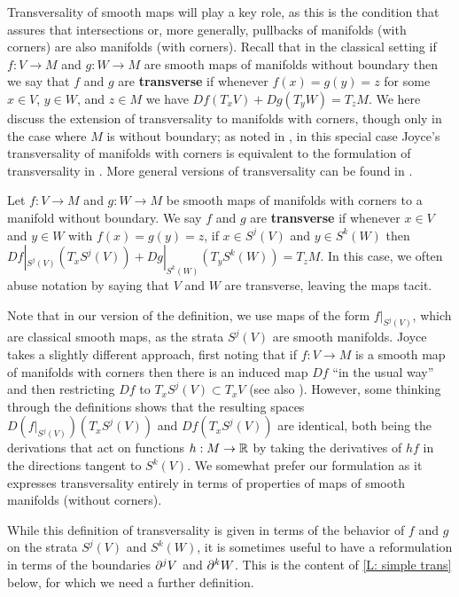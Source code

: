 Transversality of smooth maps will play a key role, as this is the condition that assures that intersections or, more generally, pullbacks of manifolds (with corners) are also manifolds (with corners).
Recall that in the classical setting if $f \colon V \to M$ and $g \colon W \to M$ are smooth maps of manifolds without boundary then we say that $f$ and $g$ are \textbf{transverse} if whenever $f(x) = g(y) = z$ for some $x \in V$, $y \in W$, and $z \in M$ we have $Df(T_xV)+Dg(T_yW) = T_z M$.
We here discuss the extension of transversality to manifolds with corners, though only in the case where $M$ is without boundary; as noted in \cite[Remark 6.3]{Joy12}, in this special case Joyce's transversality of manifolds with corners is equivalent to the formulation of transversality in \cite[Section 7.2]{MaDo92}.
More general versions of transversality can be found in \cite[Section 6]{Joy12}.

\begin{definition}{\cite[Special case of Definition 6.1]{Joy12}}
	Let $f \colon V \to M$ and $g \colon W \to M$ be smooth maps of manifolds with corners to a manifold without boundary.
	We say $f$ and $g$ are \textbf{transverse} if whenever $x \in V$ and $y\in W$ with $f(x) = g(y) = z$, if  $x\in S^j(V)$ and $y \in S^k(W)$  then $Df|_{S^j(V)}(T_xS^j(V))+Dg|_{S^k(W)}(T_yS^k(W)) = T_zM$.
	In this case, we often abuse notation by saying that $V$ and $W$ are transverse, leaving the maps tacit.
\end{definition}

Note that in our version of the definition, we use maps of the form $f|_{S^j(V)}$, which are classical smooth maps, as the strata $S^j(V)$ are smooth manifolds. Joyce takes a slightly different approach, first noting that if $f:V\to M$ is a smooth map of manifolds with corners then there is an induced map $Df$ ``in the usual way'' \cite[Definition 3.2]{Joy12} and then restricting $Df$ to $T_xS^j(V)\subset T_xV$ (see also \cite[Proposition 2.4]{Joy12}). However, some thinking through the definitions shows that the resulting spaces $D(f|_{S^j(V)})(T_xS^j(V))$ and $Df(T_xS^j(V))$ are identical, both being the derivations that act on functions $h:M\to \mathbb{R}$ by taking the derivatives of $hf$ in the directions tangent to $S^k(V)$. We somewhat prefer our formulation as it expresses transversality entirely in terms of properties of maps of smooth manifolds (without corners).

While this definition of transversality is given in terms of the behavior of $f$ and $g$ on the strata $S^j(V)$ and $S^k(W)$, it is sometimes useful to have a reformulation in terms of the boundaries $\partial^j V$ and $\partial^kW$.
This is the content of \cref{L: simple trans} below, for which we need a further definition.

